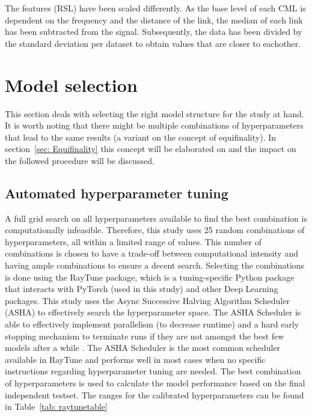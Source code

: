 \documentclass[twocolumn, 10pt, a4paper]{memoir}
\begin{document}
	The features (RSL) have been scaled differently. As the base level of each CML is dependent on the frequency and the distance of the link, the median of each link has been subtracted from the signal. Subsequently, the data has been divided by the standard deviation per dataset to obtain values that are closer to eachother.  
	
	
	
	\section{Model selection} \label{modelselection}
	This section deals with selecting the right model structure for the study at hand. It is worth noting that there might be multiple combinations of hyperparameters that lead to the same results (a variant on the concept of equifinality). In section~\ref{sec: Equifinality} this concept will be elaborated on and the impact on the followed procedure will be discussed.
	
	\subsection{Automated hyperparameter tuning} \label{RayTune}
	A full grid search on all hyperparameters available to find the best combination is computationally infeasible. Therefore, this study uses 25 random combinations of hyperparameters, all within a limited range of values. This number of combinations is chosen to have a trade-off between computational intensity and having ample combinations to ensure a decent search.
	Selecting the combinations is done using the RayTune package, which is a tuning-specific Python package that interacts with PyTorch (used in this study) and other Deep Learning packages. This study uses the Async Successive Halving Algorithm Scheduler (ASHA) to effectively search the hyperparameter space. The ASHA Scheduler is able to effectively implement parallelism (to decrease runtime) and a hard early stopping mechanism to terminate runs if they are not amongst the best few models after a while \cite{Li2018}. The ASHA Scheduler is the most common scheduler available in RayTune and performs well in most cases when no specific instructions regarding hyperparameter tuning are needed.  
	The best combination of hyperparameters is used to calculate the model performance based on the final independent testset. The ranges for the calibrated hyperparameters can be found in Table~\ref{tab: raytunetable}
	
\end{document}
